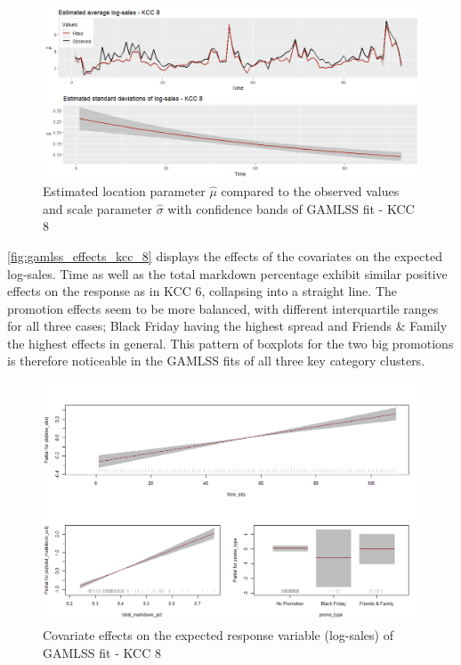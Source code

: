 \begin{figure}[H]
\centering
  \includegraphics[width=0.95\linewidth]{figures/gamlss_kcc_8_estimated_parameters.png}
  \caption{Estimated location parameter $\hat{\mu}$ compared to the observed values and scale parameter $\hat{\sigma}$ with confidence bands of GAMLSS fit - KCC 8}
  \label{fig:gamlss_kcc_8_estimated_parameters}
\end{figure}


\autoref{fig:gamlss_effects_kcc_8} displays the effects of the covariates on the expected log-sales.
Time as well as the total markdown percentage exhibit similar positive effects on the response as in \ac{KCC} 6, collapsing into a straight line. The promotion effects seem to be more balanced, with different interquartile ranges for all three cases; Black Friday having the highest spread and Friends \& Family the highest effects in general. This pattern of boxplots for the two big promotions is therefore noticeable in the \ac{GAMLSS} fits of all three key category clusters. 
\\


\begin{figure}[H]
\centering
  \includegraphics[width=0.95\linewidth]{figures/gamlss_effects_kcc_8.png}
  \caption{Covariate effects on the expected response variable (log-sales) of GAMLSS fit - KCC 8}
  \label{fig:gamlss_effects_kcc_8}
\end{figure}



